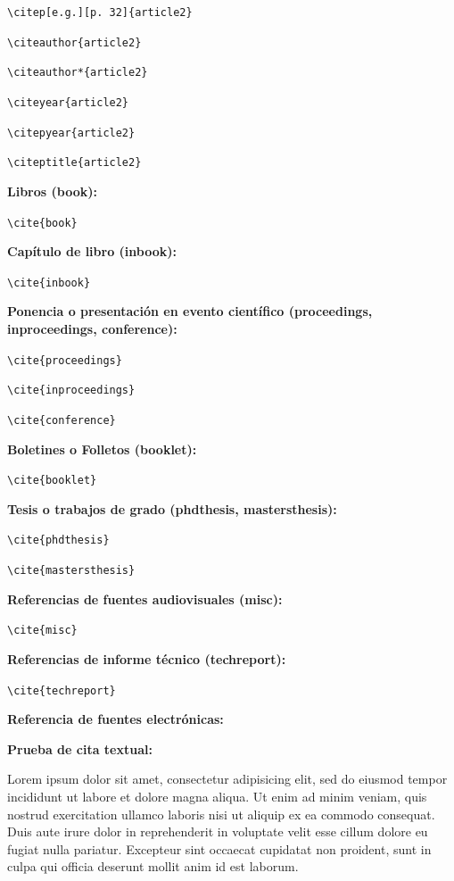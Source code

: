 \verb;\citep[e.g.][p. 32]{article2}; \citep[e.g.][p. 32]{article2}

\verb;\citeauthor{article2}; \citeauthor{article2}

\verb;\citeauthor*{article2}; \citeauthor*{article2}

\verb;\citeyear{article2}; \citeyear{article2}

\verb;\citepyear{article2}; 

\verb;\citeptitle{article2}; 

\espaciodoble\textbf{Libros (book):}

\verb;\cite{book}; \cite{book}

\espaciodoble\textbf{Capítulo de libro (inbook):}

\verb;\cite{inbook}; \cite{inbook}

\espaciodoble\textbf{Ponencia o presentación en evento científico (proceedings, inproceedings, conference):}

\verb;\cite{proceedings}; \cite{proceedings}

\verb;\cite{inproceedings}; \cite{inproceedings}

\verb;\cite{conference}; \cite{conference}

\espaciodoble\textbf{Boletines o Folletos (booklet):}

\verb;\cite{booklet}; \cite{booklet}

\espaciodoble\textbf{Tesis o trabajos de grado (phdthesis, mastersthesis):}

\verb;\cite{phdthesis}; \cite{phdthesis}

\verb;\cite{mastersthesis}; \cite{mastersthesis}

\espaciodoble\textbf{Referencias de fuentes audiovisuales (misc):}

\verb;\cite{misc}; \cite{misc}

\espaciodoble\textbf{Referencias de informe técnico (techreport):}

\verb;\cite{techreport}; \cite{techreport}

\espaciodoble\textbf{Referencia de fuentes electrónicas:}

\cite{causa2007computacion}

\break

\espaciodoble\textbf{Prueba de cita textual:}

Lorem ipsum dolor sit amet, consectetur adipisicing elit, sed do eiusmod tempor incididunt ut labore et dolore magna aliqua. Ut enim ad minim veniam, quis nostrud exercitation ullamco laboris nisi ut aliquip ex ea commodo consequat. Duis aute irure dolor in reprehenderit in voluptate velit esse cillum dolore eu fugiat nulla pariatur. Excepteur sint occaecat cupidatat non proident, sunt in culpa qui officia deserunt mollit anim id est laborum.

